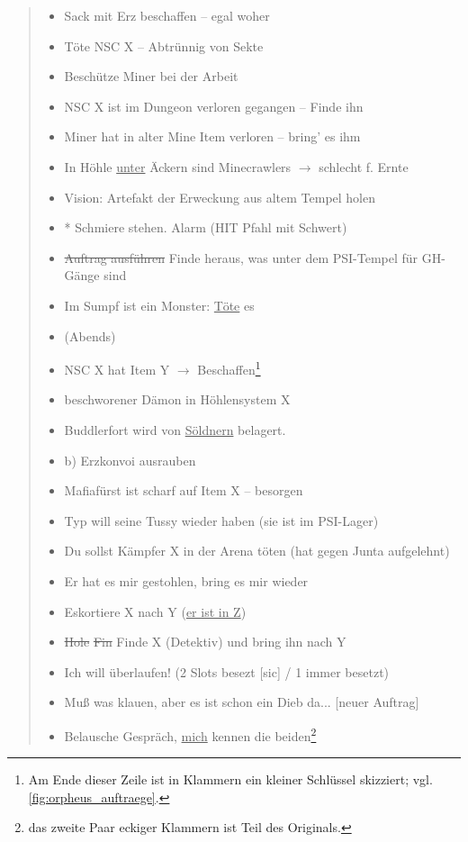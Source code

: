 \documentclass[a5paper,pagesize,numbers=noenddot]{scrbook}
\begin{document}
\begin{quote}
   \begin{itemize}
      \item[1)] Sack mit Erz beschaffen -- egal woher
      \item[2)] Töte NSC X -- Abtrünnig von Sekte
      \item[3)] Beschütze Miner bei der Arbeit
      \item[4)] NSC X ist im Dungeon verloren gegangen -- Finde ihn
      \item[5)] Miner hat in alter Mine Item verloren -- bring' es ihm
      \item[6)] In Höhle \uline{unter} Äckern sind Minecrawlers $\rightarrow$ schlecht f. Ernte
      \item[7)] Vision: Artefakt der Erweckung aus altem Tempel holen
      \item[8)] * Schmiere stehen. Alarm (HIT Pfahl mit Schwert)
      \item[9)] \sout{Auftrag ausführen} Finde heraus, was unter dem PSI-Tempel für GH-Gänge sind
      \item[10)] Im Sumpf ist ein Monster: \uline{Töte} es
      \item[] \phantom{Im Sumpf ist} (Abends)
      \item[11)] NSC X hat Item Y $\rightarrow$ Beschaffen\footnote{Am Ende dieser Zeile ist in Klammern ein kleiner Schlüssel skizziert; vgl. \autoref{fig:orpheus_auftraege}.}
      \item[12)] beschworener Dämon in Höhlensystem X
      \item[13)] Buddlerfort wird von \uline{Söldnern} belagert.
      \item[] \phantom{B}b) Erzkonvoi ausrauben
      \item[14)] Mafiafürst ist scharf auf Item X -- besorgen
      \item[15)] Typ will seine Tussy wieder haben (sie ist im PSI-Lager)
      \item[16)] Du sollst Kämpfer X in der Arena töten (hat gegen Junta aufgelehnt)
      \item[17)] Er hat es mir gestohlen, bring es mir wieder
      \item[18)] Eskortiere X nach Y (\uline{er ist in Z})
      \item[19)] \sout{Hole} \sout{Fin} Finde X (Detektiv) und bring ihn nach Y
      \item[20)] Ich will überlaufen! (2 Slots besezt [sic] / 1 immer besetzt)
      \item[21)] Muß was klauen, aber es ist schon ein Dieb da... [neuer Auftrag]
      \item[22)] Belausche Gespräch, \uline{mich} kennen die beiden\footnote{\autocite[S.~16\,f.;]{orpheus_b_scribbles} das zweite Paar eckiger Klammern ist Teil des Originals.}
   \end{itemize}
\end{quote}
\end{document}
